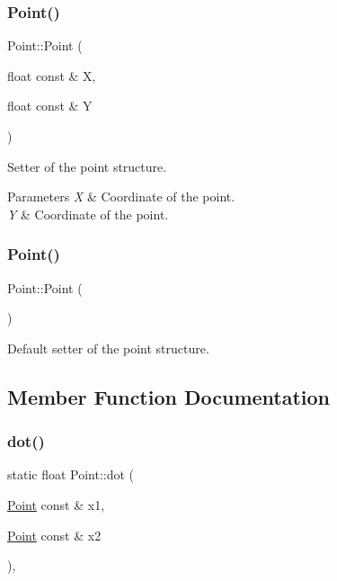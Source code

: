 \subsubsection{\texorpdfstring{Point()}{Point()}\hspace{0.1cm}{\footnotesize\ttfamily [1/2]}}
{\footnotesize\ttfamily Point\+::\+Point (\begin{DoxyParamCaption}\item[{float const \&}]{X,  }\item[{float const \&}]{Y }\end{DoxyParamCaption})\hspace{0.3cm}{\ttfamily [inline]}}



Setter of the point structure. 


\begin{DoxyParams}{Parameters}
{\em X} & Coordinate of the point. \\
\hline
{\em Y} & Coordinate of the point. \\
\hline
\end{DoxyParams}
\mbox{\label{struct_point_ad92f2337b839a94ce97dcdb439b4325a}} 
\subsubsection{\texorpdfstring{Point()}{Point()}\hspace{0.1cm}{\footnotesize\ttfamily [2/2]}}
{\footnotesize\ttfamily Point\+::\+Point (\begin{DoxyParamCaption}{ }\end{DoxyParamCaption})\hspace{0.3cm}{\ttfamily [inline]}}

Default setter of the point structure. 

\subsection{Member Function Documentation}
\mbox{\label{struct_point_a92d37e3374be80b770e9a43b54c0eec4}} 
\subsubsection{\texorpdfstring{dot()}{dot()}}
{\footnotesize\ttfamily static float Point\+::dot (\begin{DoxyParamCaption}\item[{\mbox{\hyperlink{struct_point}{Point}} const \&}]{x1,  }\item[{\mbox{\hyperlink{struct_point}{Point}} const \&}]{x2 }\end{DoxyParamCaption})\hspace{0.3cm}{\ttfamily [inline]}, {\ttfamily [static]}}



